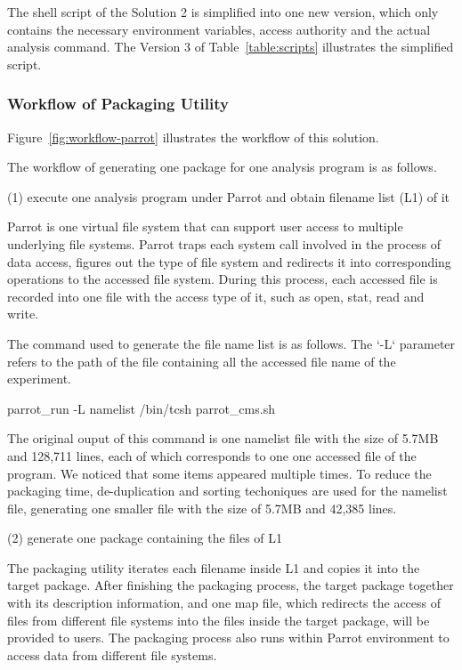 \documentclass{acm_proc_article-sp}
\begin{document}
The shell script of the Solution 2 is simplified into one new version, which
only contains the necessary environment variables, access authority and the
actual analysis command. The Version 3 of Table~\ref{table:scripts} illustrates
the simplified script.

\subsubsection{Workflow of Packaging Utility}
\begin{figure*}
\centering
{}
\caption{Workflow of Solution 4}
\label{fig:workflow-parrot}
\end{figure*}

Figure~\ref{fig:workflow-parrot} illustrates the workflow of this solution.

The workflow of generating one package for one analysis program is as follows.

(1) execute one analysis program under Parrot and obtain filename list (L1) of it

Parrot is one virtual file system that can support user access to multiple underlying file systems. Parrot traps each system call involved in the process of data access, figures out the type of file system and redirects it into corresponding operations to the accessed file system. During this process, each accessed file is recorded into one file with the access type of it, such as open, stat, read and write.

The command used to generate the file name list is as follows. The `-L` parameter refers to the path of the file containing all the accessed file name of the experiment.

parrot\_run -L namelist /bin/tcsh parrot\_cms.sh

The original ouput of this command is one namelist file with the size of 5.7MB
and 128,711 lines, each of which corresponds to one one accessed file of the
program. We noticed that some items appeared multiple times. To reduce the
packaging time, de-duplication and sorting techoniques are used for the
namelist file, generating one smaller file with the size of 5.7MB and 42,385
lines.

(2) generate one package containing the files of L1 

The packaging utility iterates each filename inside L1 and copies it into the
target package. After finishing the packaging process, the target package
together with its description information, and one map file, which redirects
the access of files from different file systems into the files inside the target package, will be
provided to users. The packaging process also runs within Parrot environment to
access data from different file systems.
\end{document}
